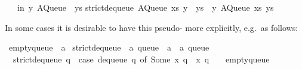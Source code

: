 \begin{isabellebody}
\begin{isamarkuptext}
\ \ {}\ in\ {}y{}\ AQueue\ {}{}\ ys{}{}\isanewline
strict{}dequeue\ {}AQueue\ xs\ {}y\ {}\ ys{}{}\ {}\ {}y{}\ AQueue\ xs\ ys{}{}\isanewline%
\end{isamarkuptext}%
\isamarkuptrue%
%
\endisatagquotetypewriter
{\isafoldquotetypewriter}%
%
\isadelimquotetypewriter
%
\endisadelimquotetypewriter
%
\begin{isamarkuptext}%
\noindent In some cases it is desirable to have this
  pseudo- more explicitly, e.g.~as follows:%
\end{isamarkuptext}%
\isamarkuptrue%
%
\isadelimquote
%
\endisadelimquote
%
\isatagquote
{}\isamarkupfalse%
\ empty{}queue\ {}{}\ {}a\isanewline
\isanewline
{}\isamarkupfalse%
\ strict{}dequeue{}\ {}{}\ {}{}a\ queue\ {}\ {}a\ {}\ {}a\ queue{}\ \isanewline
\ \ {}strict{}dequeue{}\ q\ {}\ {}case\ dequeue\ q\ of\ {}Some\ x{}\ q{}{}\ {}\ {}x{}\ q{}{}\ {}\ {}\ {}\ empty{}queue{}{}\isanewline

\end{isabellebody}
